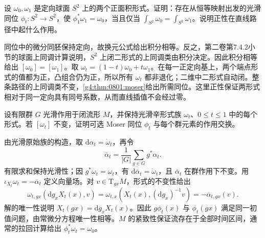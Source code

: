 \BookExercises
\begin{exercise}\label{g4:ex:0801:sphere-area}
	设 \(\omega_0,\omega_1\) 是定向球面 \(S^2\) 上的两个正面积形式。证明：存在从恒等映射出发的光滑同位 \(\phi_t:S^2\to S^2\)，使 \(\phi_1^*\omega_1=\omega_0\)，当且仅当 \(\int_{S^2}\omega_0=\int_{S^2}\omega_1\)。说明正性在直线路径中起什么作用。
\end{exercise}
\begin{solution}
	同位中的微分同胚保持定向，故换元公式给出积分相等。反之，第二卷第7.4.2小节的球面上同调计算说明，\(S^2\) 上闭二形式的上同调类由积分决定。因此积分相等给出 \([\omega_0]=[\omega_1]\)。取 \(\omega_t=(1-t)\omega_0+t\omega_1\)。在每一正定向基上，两个端点形式的值都为正，凸组合仍为正，所以所有 \(\omega_t\) 都非退化；二维中二形式自动闭。整条路径的上同调类不变，\cref{g4:thm:0801:moser}给出所需同位。这里正性保证两形式相对于同一定向具有同号系数，从而直线插值不会经过零。
\end{solution}

\begin{exercise}\label{g4:ex:0801:finite-equivariance}
	设有限群 \(G\) 光滑作用于闭流形 \(M\)，并保持光滑辛形式族 \(\omega_t\)、\(0\le t\le1\) 中的每个形式。若 \([\omega_t]\) 不变，证明可选 Moser 同位 \(\phi_t\) 与每个群元素的作用交换。
\end{exercise}
\begin{solution}
	由光滑原始族的构造，取 \(\mathrm{d}\alpha_t=\dot\omega_t\)，再令
	\[
		\overline\alpha_t=\frac1{|G|}\sum_{g\in G}g^*\alpha_t.
	\]
	有限求和保持光滑性；因 \(g^*\omega_t=\omega_t\)，有 \(\mathrm{d}\overline\alpha_t=\dot\omega_t\)，且 \(\overline\alpha_t\) 在群作用下不变。用 \(\iota_{X_t}\omega_t=-\overline\alpha_t\) 定义向量场。对 \(v\in\mathrm{T}_{g x}M\)，形式的不变性给出
	\[
		\omega_{t,gx}(\mathrm{d}g_xX_t(x),v)
		=\omega_{t,x}(X_t(x),(\mathrm{d}g_x)^{-1}v)
		=-\overline\alpha_{t,gx}(v).
	\]
	解的唯一性说明 \(X_t(gx)=\mathrm{d}g_xX_t(x)\)。因此 \(g\phi_t(x)\) 与 \(\phi_t(gx)\) 满足同一初值问题，由常微分方程唯一性相等。\(M\) 的紧致性保证流存在于全部时间区间，通常的拉回计算给出 \(\phi_t^*\omega_t=\omega_0\)。
\end{solution}


